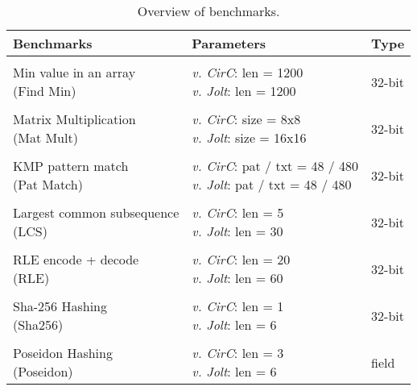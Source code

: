 \begin{table}[t]
  \begin{tabular}{l l l}
    \centering
    \textbf{Benchmarks} & \textbf{Parameters} & \textbf{Type} \\
    \hline \\
    \makecell[l]{Min value in an array \\ (Find Min)} & \makecell[l]{\emph{v. CirC}: len = 1200 \\ \emph{v. Jolt}: len = 1200} & 32-bit \\
    \vspace{2\baselineskip}\\
    \makecell[l]{Matrix Multiplication \\ (Mat Mult)} & \makecell[l]{\emph{v. CirC}: size = 8x8 \\ \emph{v. Jolt}: size = 16x16} & 32-bit \\
    \vspace{2\baselineskip}\\
    \makecell[l]{KMP pattern match \\ (Pat Match)} & \makecell[l]{\emph{v. CirC}: pat / txt = 48 / 480 \\ \emph{v. Jolt}: pat / txt = 48 / 480} & 32-bit \\
    \vspace{2\baselineskip}\\
    \makecell[l]{Largest common subsequence \\ (LCS)} & \makecell[l]{\emph{v. CirC}: len = 5 \\ \emph{v. Jolt}: len = 30} & 32-bit \\
    \vspace{2\baselineskip}\\
    \makecell[l]{RLE encode + decode \\ (RLE)} & \makecell[l]{\emph{v. CirC}: len = 20 \\ \emph{v. Jolt}: len = 60} & 32-bit \\
    \vspace{2\baselineskip}\\
    \makecell[l]{Sha-256 Hashing \\ (Sha256)} & \makecell[l]{\emph{v. CirC}: len = 1 \\ \emph{v. Jolt}: len = 6} & 32-bit \\
    \vspace{2\baselineskip}\\
    \makecell[l]{Poseidon Hashing \\ (Poseidon)} & \makecell[l]{\emph{v. CirC}: len = 3 \\ \emph{v. Jolt}: len = 6} & field \\
  \end{tabular}
  \caption{Overview of benchmarks.}
  \label{fig:benchmark_overview}
\end{table}